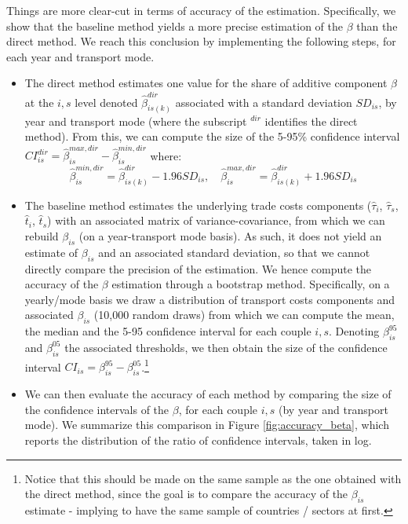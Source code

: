 \documentclass[11pt,twoside, authoryear]{elsarticle}
\begin{document}
Things are more clear-cut in terms of accuracy of the estimation. Specifically, we show that the baseline method yields a more precise estimation of the $\beta$ than the direct method. We reach this conclusion by implementing the following steps, for each year and transport mode.
\begin{itemize}
	\item The direct method estimates one value for the share of additive component $\beta$ at the $i,s$ level denoted $\hat{\beta}^{dir}_{is(k)}$ associated with a standard deviation $SD_{is}$, by year and transport mode (where the subscript $^{dir}$ identifies the direct method). From this, we can compute the size of the 5-95\% confidence interval $CI^{dir}_{is} = \hat{\beta}_{is}^{max,dir} - \hat{\beta}_{is}^{min,dir}$ where:
	$$\hat{\beta}_{is}^{min,dir} = \hat{\beta}^{dir}_{is(k)} - 1.96 SD_{is},\quad \hat{\beta}_{is}^{max,dir} = \hat{\beta}^{dir}_{is(k)} + 1.96 SD_{is}$$
	
	\item  The baseline method estimates the underlying trade costs components ($\widehat{\tau}_i$, $\widehat{\tau}_s$, $\widehat{t}_i$, $\widehat{t}_s$) with an associated matrix of variance-covariance, from which we can rebuild $\beta_{is}$ (on a year-transport mode basis). As such, it does not yield an estimate of $\beta_{is}$ and an associated standard deviation, so that we cannot directly compare the precision of the estimation. We hence compute the accuracy of the $\beta$ estimation through a bootstrap method. Specifically, on a yearly/mode basis we draw a distribution of transport costs components and associated $\beta_{is}$ (10,000 random draws) from which we can compute the mean, the median and the 5-95 confidence interval for each couple $i,s$. Denoting $\beta_{is}^{95}$ and $\beta_{is}^{05}$ the associated thresholds, we then obtain the size of the confidence interval $CI_{is}= \beta_{is}^{95}- \beta_{is}^{05}$.\footnote{Notice that this should be made on the same sample as the one obtained with the direct method, since the goal is to compare the accuracy of the $\beta_{is}$ estimate - implying to have the same sample of countries / sectors at first. }
	
\item We can then evaluate the accuracy of each  method by comparing the size of the confidence intervals of the $\beta$, for each couple $i,s$ (by year and transport mode). We summarize this comparison in Figure \ref{fig:accuracy_beta}, which reports the distribution of the ratio of confidence intervals, taken in log.
	

\end{itemize}
\end{document}
